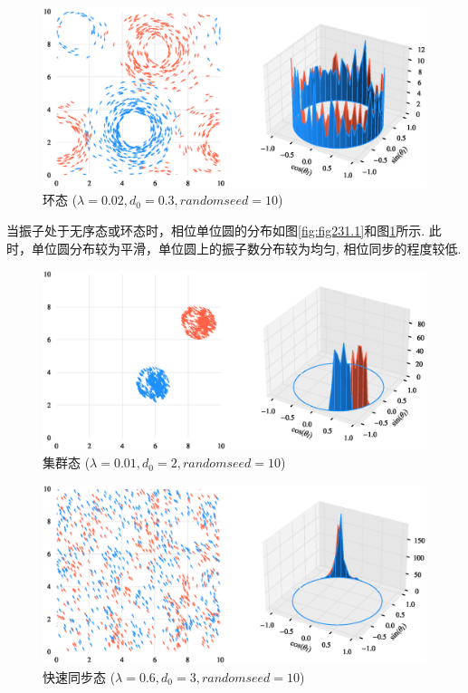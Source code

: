 \documentclass{article}
\begin{document}
\begin{figure}[H]
	\centering
	\includegraphics[width=\textwidth]{./figs/CorrectCoupling_uniform_0.020_0.30.eps}
	\vspace{-1cm}
	\caption{环态 ($\lambda=0.02, d_0=0.3, random seed=10$)}
	\label{fig:fig231.2}
\end{figure}

当振子处于无序态或环态时，相位单位圆的分布如图\ref{fig:fig231.1}和图\ref{fig:fig231.2}所示. 此时，单位圆分布较为平滑，单位圆上的振子数分布较为均匀, 相位同步的程度较低.

\begin{figure}[H]
	\centering
	\includegraphics[width=\textwidth]{./figs/CorrectCoupling_uniform_0.010_2.00.eps}
	\vspace{-1cm}
	\caption{集群态 ($\lambda=0.01, d_0=2, random seed=10$)}
	\label{fig:fig231.3}
\end{figure}

\begin{figure}[H]
	\centering
	\includegraphics[width=\textwidth]{./figs/CorrectCoupling_uniform_0.600_3.00.eps}
	\vspace{-1cm}
	\caption{快速同步态 ($\lambda=0.6, d_0=3, random seed=10$)}
	\label{fig:fig231.4}
\end{figure}
\end{document}

